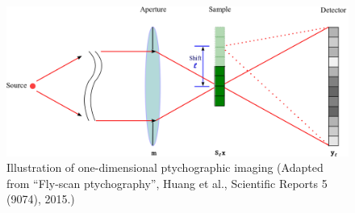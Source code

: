 \begin{figure}[hbtp]
    \includegraphics[scale=0.25]{pics/ptych1D}
    \caption{Illustration of one-dimensional ptychographic imaging {\small 
        (Adapted from ``Fly-scan ptychography'', Huang et al., 
        Scientific Reports 5 (9074), 2015.)} }
    \label{fig:ptychography_setup}
\end{figure}

